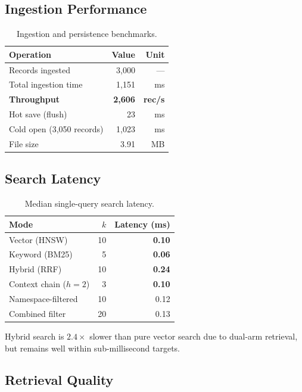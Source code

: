 \documentclass[11pt,twocolumn]{article}
\begin{document}
\subsection{Ingestion Performance}

\begin{table}[h]
\centering
\caption{Ingestion and persistence benchmarks.}
\label{tab:ingestion}
\begin{tabular}{lrr}
\toprule
Operation & Value & Unit \\
\midrule
Records ingested & 3,000 & --- \\
Total ingestion time & 1,151 & ms \\
\textbf{Throughput} & \textbf{2,606} & \textbf{rec/s} \\
Hot save (flush) & 23 & ms \\
Cold open (3,050 records) & 1,023 & ms \\
File size & 3.91 & MB \\
\bottomrule
\end{tabular}
\end{table}

\subsection{Search Latency}

\begin{table}[h]
\centering
\caption{Median single-query search latency.}
\label{tab:latency}
\begin{tabular}{lrr}
\toprule
Mode & $k$ & Latency (ms) \\
\midrule
Vector (HNSW) & 10 & \textbf{0.10} \\
Keyword (BM25) & 5 & \textbf{0.06} \\
Hybrid (RRF) & 10 & \textbf{0.24} \\
Context chain ($h=2$) & 3 & \textbf{0.10} \\
Namespace-filtered & 10 & 0.12 \\
Combined filter & 20 & 0.13 \\
\bottomrule
\end{tabular}
\end{table}

Hybrid search is $2.4\times$ slower than pure vector search due to dual-arm
retrieval, but remains well within sub-millisecond targets.

\subsection{Retrieval Quality}
\end{document}
